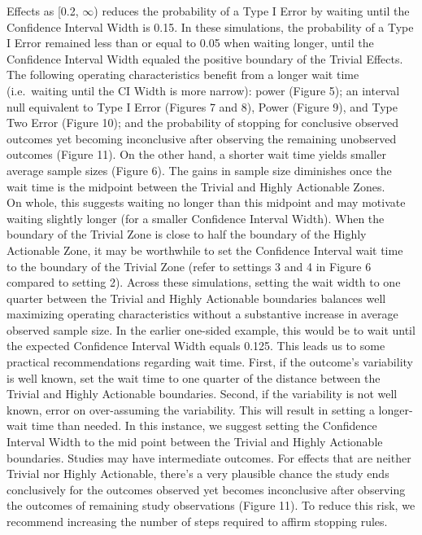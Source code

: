 \documentclass[12pt,oneside]{book}
\newlength{\li}\setlength{\li}{14.48pt}
\newlength{\di}\setlength{\di}{-3.5mm}
\theoremstyle{definition}
\theoremstyle{definition}
\theoremstyle{definition}
\theoremstyle{remark}
\begin{document}
Effects as {[}0.2, \(\infty\)) reduces the probability of a Type I Error
by waiting until the Confidence Interval Width is 0.15. In these
simulations, the probability of a Type I Error remained less than or
equal to 0.05 when waiting longer, until the Confidence Interval Width
equaled the positive boundary of the Trivial Effects. The following
operating characteristics benefit from a longer wait time (i.e.~waiting
until the CI Width is more narrow): power (Figure 5); an interval null
equivalent to Type I Error (Figures 7 and 8), Power (Figure 9), and Type
Two Error (Figure 10); and the probability of stopping for conclusive
observed outcomes yet becoming inconclusive after observing the
remaining unobserved outcomes (Figure 11). On the other hand, a shorter
wait time yields smaller average sample sizes (Figure 6). The gains in
sample size diminishes once the wait time is the midpoint between the
Trivial and Highly Actionable Zones.\\
On whole, this suggests waiting no longer than this midpoint and may
motivate waiting slightly longer (for a smaller Confidence Interval
Width). When the boundary of the Trivial Zone is close to half the
boundary of the Highly Actionable Zone, it may be worthwhile to set the
Confidence Interval wait time to the boundary of the Trivial Zone (refer
to settings 3 and 4 in Figure 6 compared to setting 2). Across these
simulations, setting the wait width to one quarter between the Trivial
and Highly Actionable boundaries balances well maximizing operating
characteristics without a substantive increase in average observed
sample size. In the earlier one-sided example, this would be to wait
until the expected Confidence Interval Width equals 0.125. This leads us
to some practical recommendations regarding wait time. First, if the
outcome's variability is well known, set the wait time to one quarter of
the distance between the Trivial and Highly Actionable boundaries.
Second, if the variability is not well known, error on over-assuming the
variability. This will result in setting a longer-wait time than needed.
In this instance, we suggest setting the Confidence Interval Width to
the mid point between the Trivial and Highly Actionable boundaries.
Studies may have intermediate outcomes. For effects that are neither
Trivial nor Highly Actionable, there's a very plausible chance the study
ends conclusively for the outcomes observed yet becomes inconclusive
after observing the outcomes of remaining study observations (Figure
11). To reduce this risk, we recommend increasing the number of steps
required to affirm stopping rules.
\end{document}
